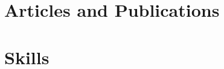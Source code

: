 \documentclass[a4paper,12pt]{article}
\begin{document}
\section{Articles and Publications}
\begin{refsection}
\nocite{*}
\printbibliography[heading=none]
\end{refsection}


\section{Skills}
\end{document}
